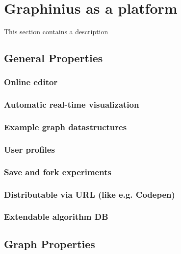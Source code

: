\chapter{Graphinius as a platform}
\label{ch:graphinius_platform}

This section contains a description


\section{General Properties}
\label{sect:general_properties}
	
	\subsection{Online editor}
	\label{ssect:online_editor}
	
	\subsection{Automatic real-time visualization}
	\label{ssect:realtime_vis}
	
	\subsection{Example graph datastructures}
	\label{ssect:pre_settings}
	
	\subsection{User profiles}
	\label{ssect:user_profiles}
	
	\subsection{Save and fork experiments}
	\label{ssect:save_fork}
	
	\subsection{Distributable via URL (like e.g. Codepen)}
	\label{ssect:distribute_url}
	
	\subsection{Extendable algorithm DB}
	\label{ssect:ext_algo_db}



\section{Graph Properties}
\label{sect:graph_properties}

